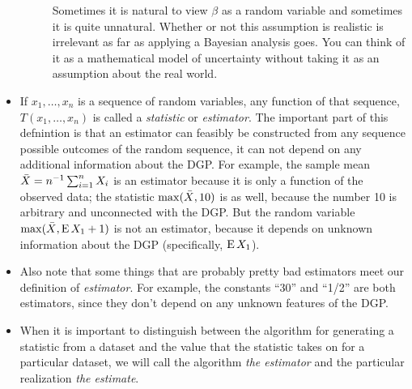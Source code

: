 \begin{itemize}[leftmargin=0pt]
\begin{description}
    Sometimes it is natural to view $\beta$ as a random variable and
    sometimes it is quite unnatural.  Whether or not this assumption
    is realistic is irrelevant as far as applying a Bayesian analysis
    goes.  You can think of it as a mathematical model of uncertainty
    without taking it as an assumption about the real world.
  \end{description}
  
\item If $x_1,\dots,x_n$ is a sequence of random variables, any function of
  that sequence, $T(x_1,\dots,x_n)$ is called a \emph{statistic} or
  \emph{estimator}.  The important part of this defnintion is that an
  estimator can feasibly be constructed from any sequence possible
  outcomes of the random sequence, it can not depend on any additional
  information about the DGP.  For example, the sample mean $\bar{X} =
  n^{-1} \sum_{i=1}^n X_i$ is an estimator because it is only a function
  of the observed data; the statistic $\max(\bar{X}, 10)$ is as well,
  because the number 10 is arbitrary and unconnected with the DGP.
  But the random variable $\max(\bar{X}, \operatorname{E} X_1 + 1)$ is not an estimator,
  because it depends on unknown information about the DGP
  (specifically, $\operatorname{E} X_1$).

\item Also note that some things that are probably pretty bad
  estimators meet our definition of \emph{estimator}.  For example,
  the constants ``30'' and ``1/2'' are both estimators, since they
  don't depend on any unknown features of the DGP.

\item When it is important to distinguish between the algorithm for
  generating a statistic from a dataset and the value that the
  statistic takes on for a particular dataset, we will call the
  algorithm \emph{the estimator} and the particular realization
  \emph{the estimate}.

\end{itemize}

